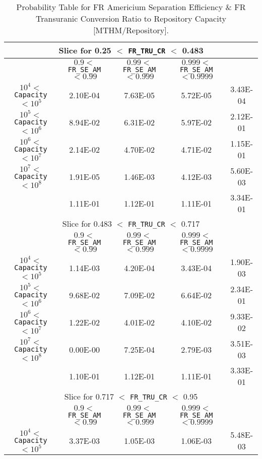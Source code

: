 \begin{center}
\begin{table}[htbp]
\caption{Probability Table for FR Americium Separation Efficiency \& FR Transuranic Conversion Ratio to Repository Capacity [MTHM/Repository].}
\label{FR_SE_AM_and_FR_TRU_CR_to_Capacity_with_IJK433_prop}
\scriptsize
\begin{center}
\begin{tabular}{|c||c|c|c||c|}
\hline
\multicolumn{5}{|c|}{Slice for 0.25 $<$ \texttt{FR\_TRU\_CR} $<$ 0.483}\\
\hline
&$0.9 <$ \texttt{FR\_SE\_AM} $< 0.99$&$0.99 <$ \texttt{FR\_SE\_AM} $< 0.999$&$0.999 <$ \texttt{FR\_SE\_AM} $< 0.9999$&\\
\hline
$10^4 <$ \texttt{Capacity} $< 10^5$&2.10E-04&7.63E-05&5.72E-05&3.43E-04\\
\hline
$10^5 <$ \texttt{Capacity} $< 10^6$&8.94E-02&6.31E-02&5.97E-02&2.12E-01\\
\hline
$10^6 <$ \texttt{Capacity} $< 10^7$&2.14E-02&4.70E-02&4.71E-02&1.15E-01\\
\hline
$10^7 <$ \texttt{Capacity} $< 10^8$&1.91E-05&1.46E-03&4.12E-03&5.60E-03\\
\hline
&1.11E-01&1.12E-01&1.11E-01&3.34E-01\\
\hline
\hline
\multicolumn{5}{|c|}{Slice for 0.483 $<$ \texttt{FR\_TRU\_CR} $<$ 0.717}\\
\hline
&$0.9 <$ \texttt{FR\_SE\_AM} $< 0.99$&$0.99 <$ \texttt{FR\_SE\_AM} $< 0.999$&$0.999 <$ \texttt{FR\_SE\_AM} $< 0.9999$&\\
\hline
$10^4 <$ \texttt{Capacity} $< 10^5$&1.14E-03&4.20E-04&3.43E-04&1.90E-03\\
\hline
$10^5 <$ \texttt{Capacity} $< 10^6$&9.68E-02&7.09E-02&6.64E-02&2.34E-01\\
\hline
$10^6 <$ \texttt{Capacity} $< 10^7$&1.22E-02&4.01E-02&4.10E-02&9.33E-02\\
\hline
$10^7 <$ \texttt{Capacity} $< 10^8$&0.00E-00&7.25E-04&2.79E-03&3.51E-03\\
\hline
&1.10E-01&1.12E-01&1.11E-01&3.33E-01\\
\hline
\hline
\multicolumn{5}{|c|}{Slice for 0.717 $<$ \texttt{FR\_TRU\_CR} $<$ 0.95}\\
\hline
&$0.9 <$ \texttt{FR\_SE\_AM} $< 0.99$&$0.99 <$ \texttt{FR\_SE\_AM} $< 0.999$&$0.999 <$ \texttt{FR\_SE\_AM} $< 0.9999$&\\
\hline
$10^4 <$ \texttt{Capacity} $< 10^5$&3.37E-03&1.05E-03&1.06E-03&5.48E-03\\

\end{tabular}
\end{center}
\end{table}
\end{center}
